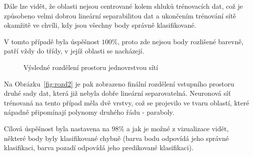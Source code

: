 Dále lze vidět, že oblasti nejsou centrované kolem shluků trénovacích dat, což je způsobeno velmi dobrou lineární separabilitou dat a ukončením trénování sítě okamžitě ve chvíli, kdy jsou všechny body správně klasifikované.

V tomto případě byla úspěšnost $100\%$, proto zde nejsou body rozlišené barevně, patří vždy do třídy, v jejíž oblasti se nacházejí.

\begin{figure}[ht!]
	\centering
	\caption{Výsledné rozdělení prostoru jednovrstvou sítí}\label{fig:rozd1}
\end{figure}

Na Obrázku~\ref{fig:rozd2} je pak zobrazeno finální rozdělení vstupního prostoru druhé sady dat, která již nebyla dobře lineární separovatelná.
Neuronová síť trénovaná na tento případ měla dvě vrstvy, což se projevilo ve tvaru oblastí, které nápadně připomínají polynomy druhého řádu - paraboly.

Cílová úspěšnost byla nastavena na $98\%$ a jak je možné z vizualizace vidět, některé body byly klasifikované chybně (barva bodu odpovídá jeho správné klasifikaci, barva pozadí odpovídá jeho predikované klasifikaci).

